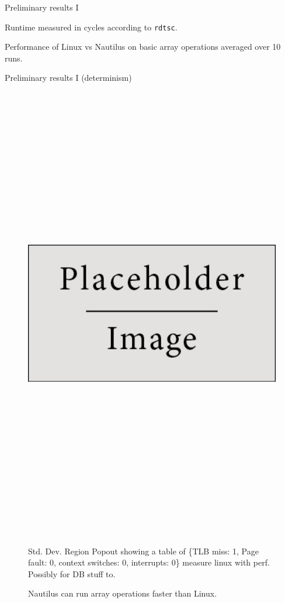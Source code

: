 \begin{block}{Preliminary results I}
\begin{table}
    Runtime measured in cycles according to \texttt{rdtsc}.

    \caption{Performance of Linux vs Nautilus on basic array operations averaged over 10 runs.}
  \end{table}
  
\end{block}

\begin{block}{Preliminary results I (determinism)}

  \begin{figure}
    \includegraphics[height=20cm]{place_holder.png}

    Std. Dev. Region
    Popout showing a table of \{TLB miss: 1, Page fault: 0, context switches: 0, interrupts: 0\}
    measure linux with perf.
    Possibly for DB stuff to.
    \caption{Nautilus can run array operations faster than Linux.}
  \end{figure}
\end{block}
